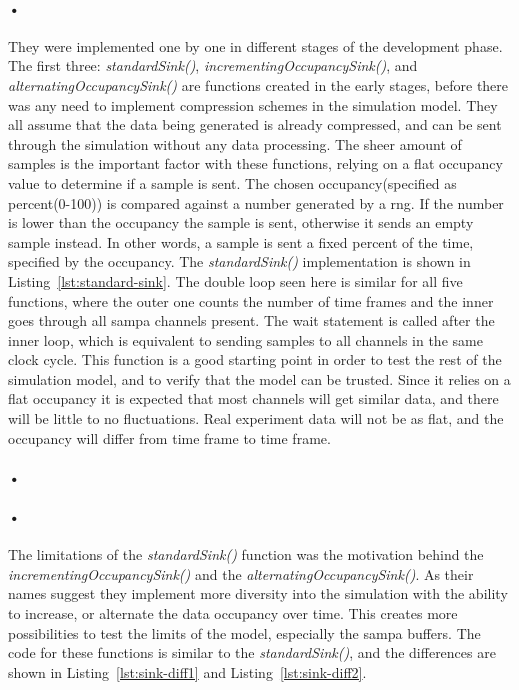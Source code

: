 \documentclass[a4paper, 12pt]{report}
\begin{document}
\paragraph{•}
They were implemented one by one in different stages of the development phase.
The first three: \textit{standardSink()}, \textit{incrementingOccupancySink()}, and \textit{alternatingOccupancySink()} are functions created in the early stages, before there was any need to implement compression schemes in the simulation model.
They all assume that the data being generated is already compressed, and can be sent through the simulation without any data processing.
The sheer amount of samples is the important factor with these functions, relying on a flat occupancy value to determine if a sample is sent.
The chosen occupancy(specified as percent(0-100)) is compared against a number generated by a \gls{rng}.
If the number is lower than the occupancy the sample is sent, otherwise it sends an empty sample instead.
In other words, a sample is sent a fixed percent of the time, specified by the occupancy.
The \textit{standardSink()} implementation is shown in Listing~\ref{lst:standard-sink}.
The double loop seen here is similar for all five functions, where the outer one counts the number of time frames and the inner goes through all \gls{sampa} channels present.
The wait statement is called after the inner loop, which is equivalent to sending samples to all channels in the same clock cycle.
This function is a good starting point in order to test the rest of the simulation model, and to verify that the model can be trusted.
Since it relies on a flat occupancy it is expected that most channels will get similar data, and there will be little to no fluctuations.
Real experiment data will not be as flat, and the occupancy will differ from time frame to time frame.

\paragraph{•}
\begin{minipage}{\linewidth}

\end{minipage}

\paragraph{•}
The limitations of the \textit{standardSink()} function was the motivation behind the \textit{incrementingOccupancySink()} and the \textit{alternatingOccupancySink()}.
As their names suggest they implement more diversity into the simulation with the ability to increase, or alternate the data occupancy over time.
This creates more possibilities to test the limits of the model, especially the \gls{sampa} buffers.
The code for these functions is similar to the \textit{standardSink()}, and the differences are shown in Listing~\ref{lst:sink-diff1} and Listing~\ref{lst:sink-diff2}.
\end{document}
